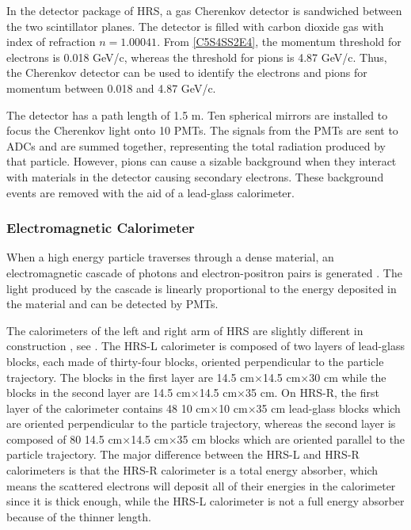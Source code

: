 In the detector package of HRS, a gas Cherenkov detector \cite{Iodice1998} is sandwiched between the two scintillator planes. The detector is filled with carbon dioxide gas with index of refraction $n=1.00041$. From \cref{C5S4SS2E4}, the momentum threshold for electrons is 0.018 GeV/c, whereas the threshold for pions is 4.87 GeV/c. Thus, the Cherenkov detector can be used to identify the electrons and pions for momentum between 0.018 and 4.87 GeV/c.

The detector has a path length of 1.5 m. Ten spherical mirrors are installed to focus the Cherenkov light onto 10 PMTs. The signals from the PMTs are sent to ADCs and are summed together, representing the total radiation produced by that particle. However, pions can cause a sizable background when they interact with materials in the detector causing secondary electrons. These background events are removed with the aid of a lead-glass calorimeter.

\subsubsection{Electromagnetic Calorimeter}

When a high energy particle traverses through a dense material, an electromagnetic cascade of photons and electron-positron pairs is generated \cite{Leo1994}. The light produced by the cascade is linearly proportional to the energy deposited in the material and can be detected by PMTs.

The calorimeters of the left and right arm of HRS are slightly different in construction \cite{Alcorn2004}, see . The HRS-L calorimeter is composed of two layers of lead-glass blocks, each made of thirty-four blocks, oriented perpendicular to the particle trajectory. The blocks in the first layer are 14.5 cm$\times$14.5 cm$\times$30 cm while the blocks in the second layer are 14.5 cm$\times$14.5 cm$\times$35 cm. On HRS-R, the first layer of the calorimeter contains 48 10 cm$\times$10 cm$\times$35 cm lead-glass blocks which are oriented perpendicular to the particle trajectory, whereas the second layer is composed of 80 14.5 cm$\times$14.5 cm$\times$35 cm blocks which are oriented parallel to the particle trajectory. The major difference between the HRS-L and HRS-R calorimeters is that the HRS-R calorimeter is a total energy absorber, which means the scattered electrons will deposit all of their energies in the calorimeter since it is thick enough, while the HRS-L calorimeter is not a full energy absorber because of the thinner length.

